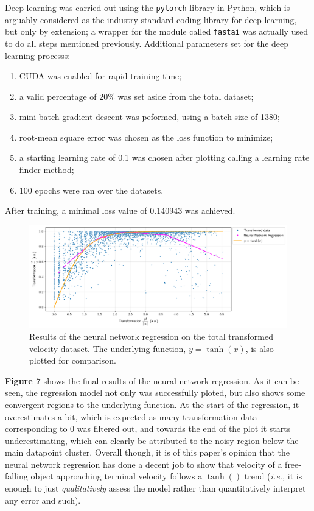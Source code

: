 \documentclass[12pt]{article}
\begin{document}
\begin{multicols}{2}
Deep learning was carried out using the \texttt{pytorch} library in Python,
which is arguably considered as the industry standard coding library for deep learning,
but only by extension; a wrapper for the module called \texttt{fastai} was actually used to do all steps mentioned previously.
Additional parameters set for the deep learning processs:
\begin{enumerate}[label=(\arabic*)]
    \item CUDA was enabled for rapid training time;
    \item a valid percentage of 20\% was set aside from the total dataset;
    \item mini-batch gradient descent was peformed, using a batch size of 1380;
    \item root-mean square error was chosen as the loss function to minimize;
    \item a starting learning rate of 0.1 was chosen after plotting calling a learning rate finder method;
    \item 100 epochs were ran over the datasets.
\end{enumerate}
After training, a minimal loss value of 0.140943 was achieved.
\begin{figure}[H]
    \centering
    \includegraphics[width=0.98\linewidth]{figs/figure7.png}
    \caption{
        Results of the neural network regression on the total transformed velocity dataset.
        The underlying function, $y=\tanh(x)$, is also plotted for comparison.
    }
    \label{fig:7}
\end{figure}
\noindent
\textbf{Figure 7} shows the final results of the neural network regression.
As it can be seen, the regression model not only was successfully ploted, but also shows some convergent regions to the underlying function.
At the start of the regression, it overestimates a bit, which is expected as many transformation data corresponding to 0 was filtered out,
and towards the end of the plot it starts underestimating, which can clearly be attributed to the noisy region below the main datapoint cluster.
Overall though, it is of this paper's opinion that the neural network regression has done a decent job to show that velocity of a free-falling object approaching terminal velocity follows a $\tanh()$ trend
(\textit{i.e.,} it is enough to just \textit{qualitatively} assess the model rather than quantitatively interpret any error and such).

\end{multicols}
\newpage
\end{document}

